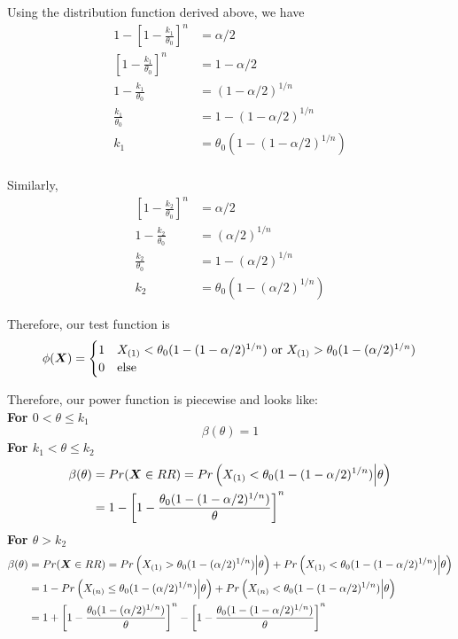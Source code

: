 \documentclass[]{article}
\newcommand{\bfX}{\mbox{\boldmath $X$}}
\begin{document}
Using the distribution function derived above, we have
\[
\begin{split}
1 - \left[1 - \frac{k_1}{\theta_0}\right]^n &= \alpha/2 \\
\left[1 - \frac{k_1}{\theta_0}\right]^n &= 1 - \alpha/2 \\
1 - \frac{k_1}{\theta_0} &= (1 - \alpha/2)^{1/n} \\
\frac{k_1}{\theta_0} &= 1 - (1 - \alpha/2)^{1/n} \\
k_1 &= \theta_0(1 - (1 - \alpha/2)^{1/n}) \\
\end{split}
\]

Similarly, 
\[
\begin{split}
\left[1 - \frac{k_2}{\theta_0}\right]^n &= \alpha/2 \\
1 - \frac{k_2}{\theta_0} &= (\alpha/2)^{1/n} \\
\frac{k_2}{\theta_0} &= 1 - (\alpha/2)^{1/n} \\
k_2 &= \theta_0(1 - (\alpha/2)^{1/n})
\end{split}
\]

Therefore, our test function is
\[
\phi(\bfX) = \begin{cases}
1 & X_{(1)} < \theta_0(1 - (1 - \alpha/2)^{1/n}) \text{ or } X_{(1)} >  \theta_0(1 - (\alpha/2)^{1/n}) \\
0 & \text{else}
\end{cases}
\]

Therefore, our power function is piecewise and looks like:\\
\textbf{For $0 < \theta \leq k_1$}
\[
\beta(\theta) = 1
\]
\textbf{For $k_1 < \theta \leq k_2$}
\[
\begin{split}
\beta(\theta) &= Pr(\bfX \in RR) = Pr\left(X_{(1)} < \theta_0(1 - (1 - \alpha/2)^{1/n}) \Big| \theta\right) \\
&= 1 - \left[1 - \frac{\theta_0(1 - (1 - \alpha/2)^{1/n}) }{\theta}\right]^n
\end{split}
\]
\textbf{For $\theta > k_2$}
\[
\begin{split}
\beta(\theta) &= Pr(\bfX \in RR) = Pr\left(X_{(1)} > \theta_0(1 - (\alpha/2)^{1/n}) \Big| \theta\right) + Pr\left(X_{(1)} < \theta_0(1 - (1 - \alpha/2)^{1/n}) \Big| \theta\right) \\
&= 1 - Pr\left(X_{(n)}\leq  \theta_0(1 - (\alpha/2)^{1/n}) \Big| \theta\right) + Pr\left(X_{(n)} < \theta_0(1 - (1 - \alpha/2)^{1/n}) \Big| \theta\right) \\
&= 1 + \left[1 - \frac{\theta_0(1 - (\alpha/2)^{1/n})}{\theta}\right]^n - \left[1 - \frac{\theta_0(1 - (1 - \alpha/2)^{1/n})}{\theta}\right]^n
\end{split}
\]
\end{document}
